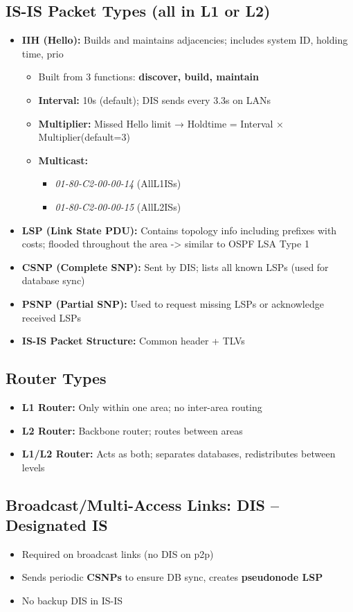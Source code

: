\begin{multicols*}{5}
		\subsection{IS-IS Packet Types (all in L1 or L2)}
		\begin{itemize}
			\item \textbf{IIH (Hello):} Builds and maintains adjacencies; includes system ID, holding time, prio
			\begin{itemize}
				\item Built from 3 functions: \textbf{discover, build, maintain}
				\item \textbf{Interval:} 10s (default); DIS sends every 3.3s on LANs
				\item \textbf{Multiplier:} Missed Hello limit → Holdtime = Interval × Multiplier(default=3)
				\item \textbf{Multicast:}
				\begin{itemize}
					\item \textit{01-80-C2-00-00-14} (AllL1ISs)
					\item \textit{01-80-C2-00-00-15} (AllL2ISs)
				\end{itemize}
			\end{itemize}
			
			\item \textbf{LSP (Link State PDU):} Contains topology info including prefixes with costs; flooded throughout the area -> similar to OSPF LSA Type 1
			\item \textbf{CSNP (Complete SNP):} Sent by DIS; lists all known LSPs (used for database sync)
			\item \textbf{PSNP (Partial SNP):} Used to request missing LSPs or acknowledge received LSPs
			\item \textbf{IS-IS Packet Structure:} Common header + TLVs
		\end{itemize}
		\subsection{Router Types}
		\begin{itemize}
			\item \textbf{L1 Router:} Only within one area; no inter-area routing
			\item \textbf{L2 Router:} Backbone router; routes between areas
			\item \textbf{L1/L2 Router:} Acts as both; separates databases, redistributes between levels
		\end{itemize}
		\subsection{Broadcast/Multi-Access Links: DIS – Designated IS}
		\begin{itemize}
			\item Required on broadcast links (no DIS on p2p)
			\item Sends periodic \textbf{CSNPs} to ensure DB sync, creates \textbf{pseudonode LSP}
			\item No backup DIS in IS-IS
		\end{itemize}
		

\end{multicols*}
